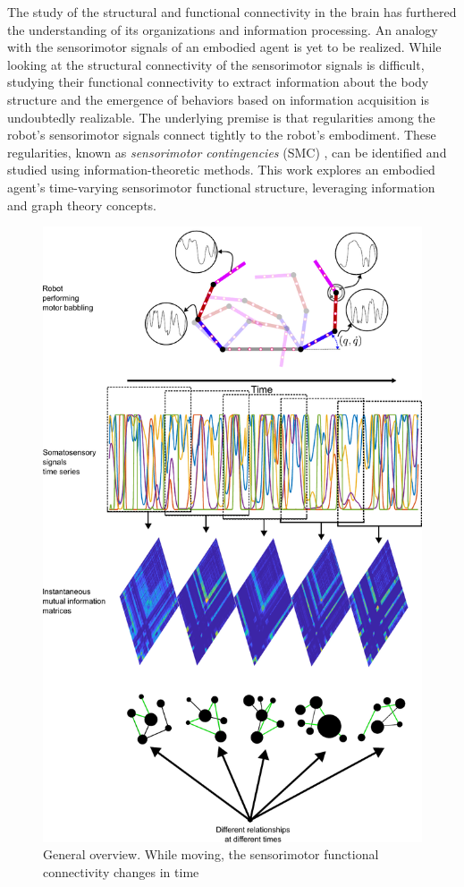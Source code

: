The study of the structural and functional connectivity in the brain has furthered the understanding of its organizations and information processing. An analogy with the sensorimotor signals of an embodied agent is yet to be realized. While looking at the structural connectivity of the sensorimotor signals is difficult, studying their functional connectivity to extract information about the body structure and the emergence of behaviors based on information acquisition is undoubtedly realizable. The underlying premise is that regularities among the robot's sensorimotor signals connect tightly to the robot's embodiment. These regularities, known as \emph{sensorimotor contingencies} (SMC) \cite{Jacquey2019Sensorimotorcontingenciesas}, can be identified and studied using information-theoretic methods. This work explores an embodied agent's time-varying sensorimotor functional structure, leveraging information and graph theory concepts. 
\begin{figure}[!ht]
	\centering
	\includegraphics[width=0.9\columnwidth]{somatosensry_dynamic_functional_connectivity.pdf}
	\caption{General overview. While moving, the sensorimotor functional connectivity changes in time}
	\label{fig:general_overview}
\end{figure}
